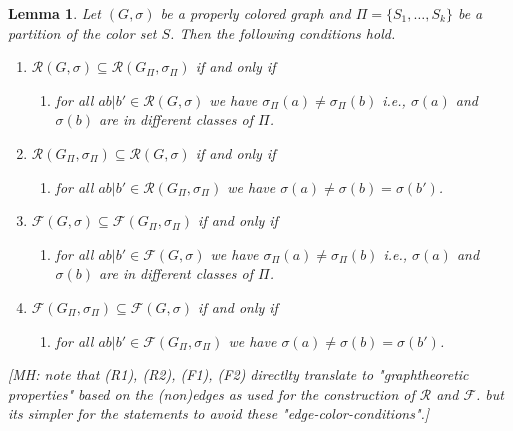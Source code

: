 \documentclass[final,3p,times]{elsarticle}
\newtheorem{lemma}[theorem]{Lemma}%
\newcommand{\TODO}[1]{\begingroup\color{red}#1\endgroup}
\begin{document}
\begin{lemma}\label{lem:R-Ri}
	Let $(G,\sigma)$ be a properly colored graph and $\Pi =  \{S_1,\dots,S_k\}$
	be a partition of the color set $S$. Then the following conditions hold. 
	
	\begin{enumerate}
 		\item $\mathscr{R}(G,\sigma) \subseteq \mathscr{R}(G_\Pi,\sigma_\Pi)$
 			  	  if and only if 
	
			\begin{enumerate}[noitemsep]
 			  	 \item[(R1):]  for all $ab|b' \in \mathscr{R}(G,\sigma)$ we have 
 			  	 $\sigma_\Pi(a) \neq  \sigma_\Pi(b)$ 
			      i.e., $\sigma(a)$ and $\sigma(b)$ are in different classes
			      of  $\Pi$. 	
			\end{enumerate}			      

 		\item $\mathscr{R}(G_\Pi,\sigma_\Pi)  \subseteq  \mathscr{R}(G,\sigma)$
 			  	  if and only if 			  	   
	
			\begin{enumerate}[noitemsep]
 			  	 \item[(R2):] for all $ab|b' \in \mathscr{R}(G_\Pi,\sigma_\Pi)$ we have 
 			  	 $\sigma(a) \neq \sigma(b) = \sigma(b')$. 
			\end{enumerate}			      
			      
 		\item $\mathscr{F}(G,\sigma) \subseteq \mathscr{F}(G_\Pi,\sigma_\Pi)$
 			  	  if and only if 
	
			\begin{enumerate}[noitemsep]
 			  	 \item[(F1):]  for all $ab|b' \in \mathscr{F}(G,\sigma)$ we have 
 			  	 $\sigma_\Pi(a) \neq  \sigma_\Pi(b)$ 
			      i.e., $\sigma(a)$ and $\sigma(b)$ are in different classes
			      of  $\Pi$. 	
			\end{enumerate}			      

 		\item $\mathscr{F}(G_\Pi,\sigma_\Pi)  \subseteq  \mathscr{F}(G,\sigma)$
 			  	  if and only if 			  	   
	
			\begin{enumerate}[noitemsep]
 			  	 \item[(F2):] for all $ab|b' \in \mathscr{F}(G_\Pi,\sigma_\Pi)$ we have 
 			  	 $\sigma(a) \neq \sigma(b) = \sigma(b')$. 
			\end{enumerate}			      
	\end{enumerate}
	\TODO{[MH: note that (R1),  (R2),  (F1),  (F2) directlty translate to
	     "graphtheoretic properties" based on the (non)edges as used 
	     for the construction of $\mathscr{R}$ and $\mathscr{F}$. 
	     but its simpler for the statements to avoid these "edge-color-conditions".] }
\end{lemma}
\end{document}
